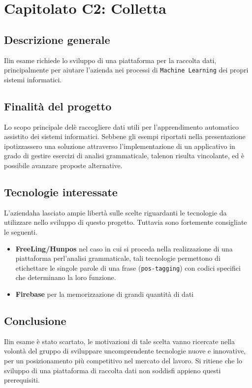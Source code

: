 \chapter{Capitolato C2: Colletta}
\section{Descrizione generale}
Ilin esame richiede lo sviluppo di una piattaforma per la raccolta dati, principalmente per aiutare l'azienda nei processi di \texttt{Machine Learning} dei propri sistemi informatici.

\section{Finalit\`a del progetto}
Lo scopo principale delè raccogliere dati utili per l'apprendimento automatico assistito dei sistemi informatici. Sebbene gli esempi riportati nella presentazione ipotizzassero una soluzione attraverso l'implementazione di un applicativo in grado di gestire esercizi di analisi grammaticale, talenon risulta vincolante, ed è possibile avanzare proposte alternative.

\section{Tecnologie interessate}
L'aziendaha lasciato ampie libertà sulle scelte riguardanti le tecnologie da utilizzare nello sviluppo di questo progetto. Tuttavia sono fortemente consigliate le seguenti.
\begin{itemize}
	\item \textbf{FreeLing/Hunpos} nel caso in cui si proceda nella realizzazione di una piattaforma perl'analisi grammaticale, tali tecnologie permettono di etichettare le singole parole di una frase (\texttt{pos-tagging}) con codici specifici che determinano la loro funzione.
	\item \textbf{Firebase} per la memorizzazione di grandi quantità di dati
\end{itemize}
\section{Conclusione}
Ilin esame è stato scartato, le motivazioni di tale scelta vanno ricercate nella volontà del gruppo di sviluppare uncomprendente tecnologie nuove e innovative, per un posizionamento più competitivo nel mercato del lavoro. Si ritiene che lo sviluppo di una piattaforma di raccolta dati non soddisfi appieno questi prerequisiti. 